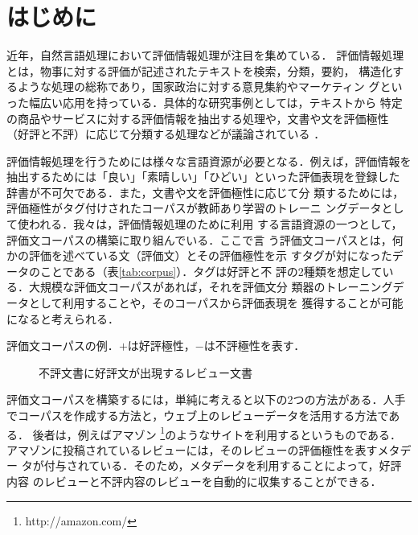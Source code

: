 \documentclass[japanese]{jnlp_1.4}
\begin{document}
\maketitle


\section{はじめに}

近年，自然言語処理において評価情報処理が注目を集めている\cite{Inui06}．
評価情報処理とは，物事に対する評価が記述されたテキストを検索，分類，要約，
構造化するような処理の総称であり，国家政治に対する意見集約やマーケティン
グといった幅広い応用を持っている．具体的な研究事例としては，テキストから
特定の商品やサービスに対する評価情報を抽出する処理や，文書や文を評価極性
（好評と不評）に応じて分類する処理などが議論されている
\cite{Kobayashi05,Pang02,Kudo04,Matsumoto05,Fujimura05,Osashima05,McDonald07}．

評価情報処理を行うためには様々な言語資源が必要となる．例えば，評価情報を
抽出するためには「良い」「素晴しい」「ひどい」といった評価表現を登録した
辞書が不可欠である\cite{Kobayashi05}．また，文書や文を評価極性に応じて分
類するためには，評価極性がタグ付けされたコーパスが教師あり学習のトレーニ
ングデータとして使われる\cite{Pang02}．我々は，評価情報処理のために利用
する言語資源の一つとして，評価文コーパスの構築に取り組んでいる．ここで言
う評価文コーパスとは，何かの評価を述べている文（評価文）とその評価極性を示
すタグが対になったデータのことである（表\ref{tab:corpus}）．タグは好評と不
評の2種類を想定している．大規模な評価文コーパスがあれば，それを評価文分
類器のトレーニングデータとして利用することや，そのコーパスから評価表現を
獲得することが可能になると考えられる．

\begin{table}[b]
\caption{評価文コーパスの例．$+$は好評極性，$-$は不評極性を表す．}
\label{tab:corpus}

\end{table}
\begin{figure}[b]

  \caption{不評文書に好評文が出現するレビュー文書}
  \label{fig:pang}
\end{figure}

評価文コーパスを構築するには，単純に考えると以下の2つの方法がある．人手
でコーパスを作成する方法と，ウェブ上のレビューデータを活用する方法である．
後者は，例えばアマゾン
\footnote{http://amazon.com/}のようなサイトを利用するというものである．
アマゾンに投稿されているレビューには，そのレビューの評価極性を表すメタデー
タが付与されている．そのため，メタデータを利用することによって，好評内容
のレビューと不評内容のレビューを自動的に収集することができる．
\end{document}
